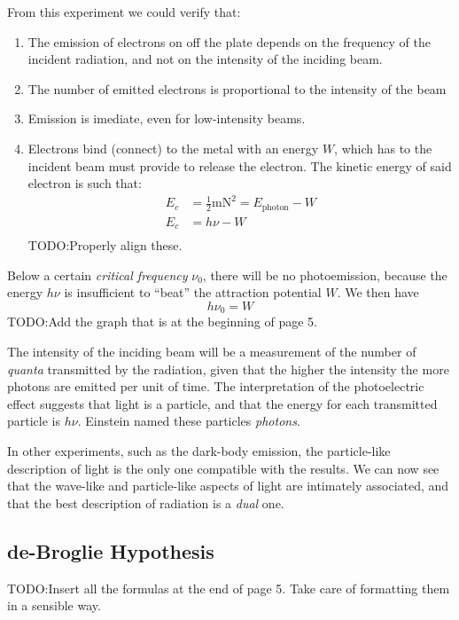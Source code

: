 \documentclass{article}[10pt]
\begin{document}
From this experiment we could verify that:
\begin{enumerate}
    \item The emission of electrons on off the plate depends on the frequency of
          the incident radiation, and not on the intensity of the inciding beam.
    \item The number of emitted electrons is proportional to the intensity of
          the beam
    \item Emission is imediate, even for low-intensity beams.
    \item Electrons bind (connect) to the metal with an energy $W$, which has to
          the incident beam must provide to release the electron. The kinetic
          energy of said electron is such that:
          \begin{align*}
              E_c &= \frac{1}{2}\si{\metre\newton}^2 = E_{\text{photon}} - W \\
              E_c &= h\nu - W \\
          \end{align*}
          TODO:\@ Properly align these.\\
\end{enumerate}
Below a certain \emph{critical frequency} $\nu_0$, there will be no
photoemission, because the energy $h\nu$ is insufficient to ``beat''
the attraction potential $W$. We then have
$$h\nu_0 = W$$
TODO:\@ Add the graph that is at the beginning of page 5.

The intensity of the inciding beam will be a measurement of the number of
\emph{quanta} transmitted by the radiation, given that the higher the intensity
the more photons are emitted per unit of time. The interpretation of the
photoelectric effect suggests that light is a particle, and that the energy for
each transmitted particle is $h\nu$. Einstein named these particles \emph{photons}.

In other experiments, such as the dark-body emission, the particle-like
description of light is the only one compatible with the results. We can now see
that the wave-like and particle-like aspects of light are intimately associated,
and that the best description of radiation is a \emph{dual} one.
\subsection{de-Broglie Hypothesis}
TODO:\@ Insert all the formulas at the end of page 5. Take care of formatting
them in a sensible way.
\end{document}
